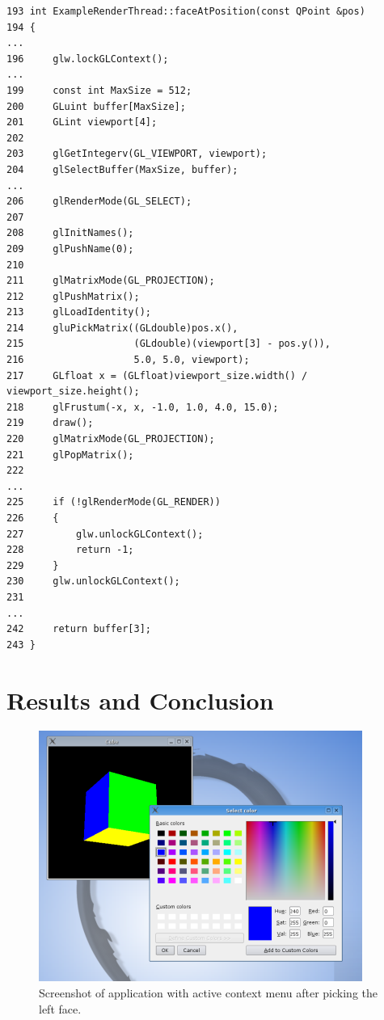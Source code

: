 \documentclass[prodmode,acmtopc]{acmsmall}
\begin{document}
\begin{lstlisting}
193 int ExampleRenderThread::faceAtPosition(const QPoint &pos)
194 {
...
196     glw.lockGLContext();
...
199     const int MaxSize = 512;
200     GLuint buffer[MaxSize];
201     GLint viewport[4];
202
203     glGetIntegerv(GL_VIEWPORT, viewport);
204     glSelectBuffer(MaxSize, buffer);
...
206     glRenderMode(GL_SELECT);
207
208     glInitNames();
209     glPushName(0);
210
211     glMatrixMode(GL_PROJECTION);
212     glPushMatrix();
213     glLoadIdentity();
214     gluPickMatrix((GLdouble)pos.x(),
215                   (GLdouble)(viewport[3] - pos.y()),
216                   5.0, 5.0, viewport);
217     GLfloat x = (GLfloat)viewport_size.width() / viewport_size.height();
218     glFrustum(-x, x, -1.0, 1.0, 4.0, 15.0);
219     draw();
220     glMatrixMode(GL_PROJECTION);
221     glPopMatrix();
222
...
225     if (!glRenderMode(GL_RENDER))
226     {
227         glw.unlockGLContext();
228         return -1;
229     }
230     glw.unlockGLContext();
231
...
242     return buffer[3];
243 }
\end{lstlisting}

\section{Results and Conclusion}

\begin{figure}[tbp]
\begin{center}
  \includegraphics[width=.95\textwidth  %
  ]
  {threadedcube_screenshot.png}
\caption{Screenshot of application with active context menu after picking the
  left face.
}
  \label{fig:screenshot}
\end{center}
\end{figure}
\end{document}
